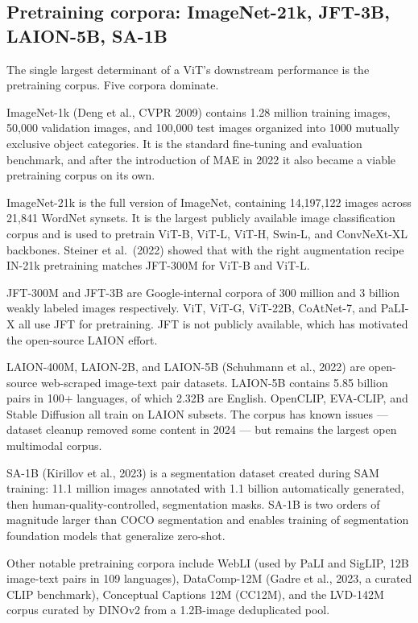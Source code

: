 \subsection{Pretraining corpora: ImageNet-21k, JFT-3B, LAION-5B, SA-1B}\label{pretraining-corpora-imagenet-21k-jft-3b-laion-5b-sa-1b}

The single largest determinant of a ViT's downstream performance is the pretraining corpus. Five corpora dominate.

ImageNet-1k (Deng et al., CVPR 2009) contains 1.28 million training images, 50,000 validation images, and 100,000 test images organized into 1000 mutually exclusive object categories. It is the standard fine-tuning and evaluation benchmark, and after the introduction of MAE in 2022 it also became a viable pretraining corpus on its own.

ImageNet-21k is the full version of ImageNet, containing 14,197,122 images across 21,841 WordNet synsets. It is the largest publicly available image classification corpus and is used to pretrain ViT-B, ViT-L, ViT-H, Swin-L, and ConvNeXt-XL backbones. Steiner et al.~(2022) showed that with the right augmentation recipe IN-21k pretraining matches JFT-300M for ViT-B and ViT-L.

JFT-300M and JFT-3B are Google-internal corpora of 300 million and 3 billion weakly labeled images respectively. ViT, ViT-G, ViT-22B, CoAtNet-7, and PaLI-X all use JFT for pretraining. JFT is not publicly available, which has motivated the open-source LAION effort.

LAION-400M, LAION-2B, and LAION-5B (Schuhmann et al., 2022) are open-source web-scraped image-text pair datasets. LAION-5B contains 5.85 billion pairs in 100+ languages, of which 2.32B are English. OpenCLIP, EVA-CLIP, and Stable Diffusion all train on LAION subsets. The corpus has known issues --- dataset cleanup removed some content in 2024 --- but remains the largest open multimodal corpus.

SA-1B (Kirillov et al., 2023) is a segmentation dataset created during SAM training: 11.1 million images annotated with 1.1 billion automatically generated, then human-quality-controlled, segmentation masks. SA-1B is two orders of magnitude larger than COCO segmentation and enables training of segmentation foundation models that generalize zero-shot.

Other notable pretraining corpora include WebLI (used by PaLI and SigLIP, 12B image-text pairs in 109 languages), DataComp-12M (Gadre et al., 2023, a curated CLIP benchmark), Conceptual Captions 12M (CC12M), and the LVD-142M corpus curated by DINOv2 from a 1.2B-image deduplicated pool.

